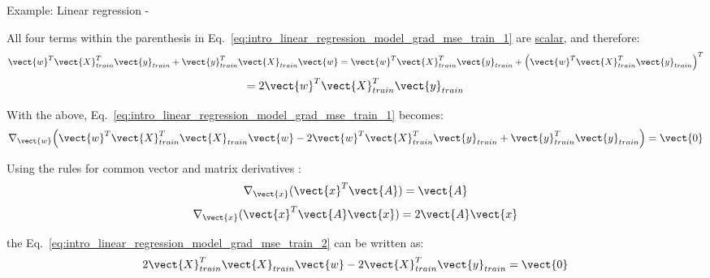 \begin{frame}[t,allowframebreaks]{
    Example: Linear regression - }
    \framebreak


    All four terms within the parenthesis in 
    Eq.~\ref{eq:intro_linear_regression_model_grad_mse_train_1} are 
    \underline{scalar}, and therefore:\\
    \vspace{-0.5cm}
    \begin{equation*}
        \vect{w}^T \vect{X}_{train}^T \vect{y}_{train} +
        \vect{y}_{train}^T \vect{X}_{train} \vect{w} =
        \vect{w}^T \vect{X}_{train}^T \vect{y}_{train} +
        \Big( \vect{w}^T \vect{X}_{train}^T \vect{y}_{train} \Big)^T 
    \end{equation*}
    \begin{equation}
        = 2 \vect{w}^T \vect{X}_{train}^T \vect{y}_{train}
    \end{equation}

    With the above,     
    Eq.~\ref{eq:intro_linear_regression_model_grad_mse_train_1} 
    becomes:\\
    \vspace{-0.2cm}
    \begin{equation}
        \nabla_{\vect{w}}             
        \Big(
            \vect{w}^T \vect{X}_{train}^T \vect{X}_{train} \vect{w}
            - 2 \vect{w}^T \vect{X}_{train}^T \vect{y}_{train}
            + \vect{y}_{train}^T \vect{y}_{train}    
        \Big)     
        = \vect{0} 
        \label{eq:intro_linear_regression_model_grad_mse_train_2}
    \end{equation}

    Using the rules for common vector and matrix 
    derivatives \cite{MatrixCookbook}:\\
    \vspace{-0.2cm}
    \begin{equation}
        \nabla_{\vect{x}} (\vect{x}^T \vect{A}) = \vect{A}
    \end{equation}
    \begin{equation}
        \nabla_{\vect{x}} (\vect{x}^T \vect{A} \vect{x}) = 2\vect{A}\vect{x}
    \end{equation}

    the Eq.~\ref{eq:intro_linear_regression_model_grad_mse_train_2} 
    can be written as:\\
    \vspace{-0.3cm}
    \begin{equation}
            2 \vect{X}_{train}^T \vect{X}_{train} \vect{w}
            - 2 \vect{X}_{train}^T \vect{y}_{train}
            = \vect{0} 
        \label{eq:intro_linear_regression_model_grad_mse_train_3}
    \end{equation}


\end{frame}
